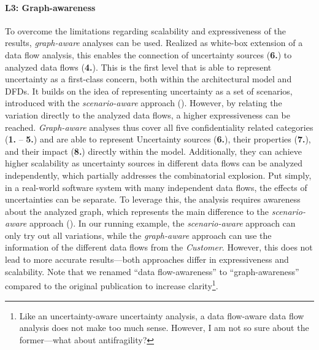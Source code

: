 \paragraph{L3: Graph-awareness}\label{awarenesslevel:3}
To overcome the limitations regarding scalability and expressiveness of the results, \emph{graph-aware} analyses can be used.
Realized as white-box extension \cite{boltz_architectural_2021,bitschi_uncertainty-aware_2022,boltz_handling_2022,hahner_architecture-based_2023} of a data flow analysis, this enables the connection of uncertainty sources (\textbf{6.}) to analyzed data flows (\textbf{4.}).
This is the first level that is able to represent uncertainty as a first-class concern, both within the architectural model and \acp{DFD}.
It builds on the idea of representing uncertainty as a set of scenarios, introduced with the \emph{scenario-aware} approach ().
However, by relating the variation directly to the analyzed data flows, a higher expressiveness can be reached.
\emph{Graph-aware} analyses thus cover all five confidentiality related categories (\textbf{1.} -- \textbf{5.}) and are able to represent Uncertainty sources (\textbf{6.}), their properties (\textbf{7.}), and their impact (\textbf{8.}) directly within the model.
Additionally, they can achieve higher scalability as uncertainty sources in different data flows can be analyzed independently, which partially addresses the combinatorial explosion.
Put simply, in a real-world software system with many independent data flows, the effects of uncertainties can be separate.
To leverage this, the analysis requires awareness about the analyzed graph, which represents the main difference to the \emph{scenario-aware} approach ().
In our running example, the \emph{scenario-aware} approach can only try out all variations, while the \emph{graph-aware} approach can use the information of the different data flows from the \emph{Customer}.
However, this does not lead to more accurate results---both approaches differ in expressiveness and scalability.
Note that we renamed \enquote{data flow-awareness} to \enquote{graph-awareness} compared to the original publication \cite{hahner_model-based_2023} to increase clarity\footnote{Like an uncertainty-aware uncertainty analysis, a data flow-aware data flow analysis does not make too much sense. However, I am not so sure about the former---what about antifragility?}.


